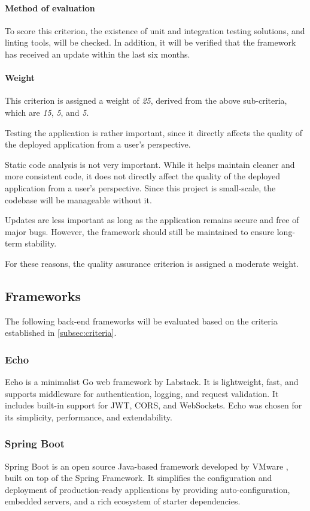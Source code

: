 \paragraph{Method of evaluation}
To score this criterion, the existence of unit and integration testing solutions, and linting tools, will be checked.
In addition, it will be verified that the framework has received an update within the last six months.

\paragraph{Weight}
This criterion is assigned a weight of \emph{25}, derived from the above sub-criteria, which are \emph{15}, \emph{5}, and \emph{5}.

Testing the application is rather important, since it directly affects the quality of the deployed application from a user's perspective.

Static code analysis is not very important.
While it helps maintain cleaner and more consistent code, it does not directly affect the quality of the deployed application from a user's perspective.
Since this project is small-scale, the codebase will be manageable without it.

Updates are less important as long as the application remains secure and free of major bugs.
However, the framework should still be maintained to ensure long-term stability.

For these reasons, the quality assurance criterion is assigned a moderate weight.

\subsection{Frameworks}\label{subsec:frameworks}
The following back-end frameworks will be evaluated based on the criteria established in \cref{subsec:criteria}.

\subsubsection{Echo}\label{subsubsec:frameworks-echo}
Echo is a minimalist Go web framework by Labstack.
It is lightweight, fast, and supports middleware for authentication, logging, and request validation.
It includes built-in support for JWT, CORS, and WebSockets.
Echo was chosen for its simplicity, performance, and extendability. \cite{bib:echo-framework}

\subsubsection{Spring Boot}\label{subsubsec:frameworks-spring-boot}
Spring Boot is an open source Java-based framework developed by VMware \cite{bib:springboot-creator}, built on top of the Spring Framework.
It simplifies the configuration and deployment of production-ready applications by providing auto-configuration, embedded servers, and a rich ecosystem of starter dependencies. \cite{bib:spring-boot-framework}

